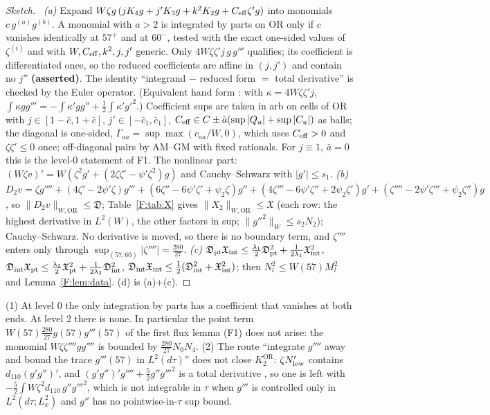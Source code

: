 \documentclass[11pt]{article}
\newcommand{\OR}{\mathrm{OR}}\newcommand{\eI}{\varepsilon_I}
\newcommand{\fD}{\mathfrak D}\newcommand{\fX}{\mathfrak X}\newcommand{\fa}{\mathfrak a}
\begin{document}
\begin{proof}[Sketch]\tH\
\emph{(a)} Expand $W\zeta g\,(jK_4g+j'K_3g+k^2K_2g+C_{\rm eff}\zeta'g)$ into monomials $c\,g^{(a)}g^{(b)}$. A monomial with $a>2$ is integrated by parts on $\OR$ only if $c$ vanishes identically at $57^+$ and at $60^-$, tested with the exact one-sided values of $\zeta^{(i)}$ and with $W,C_{\rm eff},k^2,j,j'$ generic. Only $4W\zeta\zeta'j\,g\,g'''$ qualifies; its coefficient is differentiated once, so the reduced coefficients are affine in $(j,j')$ and contain no $j''$ \textbf{(asserted)}. The identity ``integrand $-$ reduced form $=$ total derivative'' is checked by the Euler operator. (Equivalent hand form \tS: with $\kappa=4W\zeta\zeta'j$, $\int\kappa gg'''=-\int\kappa'gg''+\frac12\int\kappa'g'^2$.) Coefficient sups are taken in arb on cells of $\OR$ with $j\in[1-\bar c,1+\bar c]$, $j'\in[-\bar c_1,\bar c_1]$, $C_{\rm eff}\in C\pm\bar a(\sup|Q_u|+\sup|C_u|)$ as balls; the diagonal is one-sided, $\Gamma_{aa}=\sup\max(c_{aa}/W,0)$, which uses $C_{\rm eff}>0$ and $\zeta\zeta'\le0$ once; off-diagonal pairs by AM--GM with fixed rationals. For $j\equiv1$, $\bar a=0$ this is the level-0 statement of F1. The nonlinear part: $(W\zeta v)'=W(\zeta^2g'+(2\zeta\zeta'-\psi'\zeta^2)g)$ and Cauchy--Schwarz with $|g'|\le s_1$.
\emph{(b)} $D_2v=\zeta g''''+(4\zeta'-2\psi'\zeta)g'''+(6\zeta''-6\psi'\zeta'+\psi_2\zeta)g''+(4\zeta'''-6\psi'\zeta''+2\psi_2\zeta')g'+(\zeta''''-2\psi'\zeta'''+\psi_2\zeta'')g$ \tS, so $\|D_2v\|_{W,\OR}\le\fD$; Table~\ref{F:tab:X} gives $\|X_2\|_{W,\OR}\le\fX$ (each row: the highest derivative in $L^2(W)$, the other factors in sup; $\|g''^2\|_W\le s_2N_2$); Cauchy--Schwarz. No derivative is moved, so there is no boundary term, and $\zeta''''$ enters only through $\sup_{(57,60)}|\zeta''''|=\frac{280}{27}$.
\emph{(c)} $\fD_{\rm pt}\fX_{\rm int}\le\frac{\lambda_1}2\fD_{\rm pt}^2+\frac1{2\lambda_1}\fX_{\rm int}^2$, $\fD_{\rm int}\fX_{\rm pt}\le\frac{\lambda_2}2\fX_{\rm pt}^2+\frac1{2\lambda_2}\fD_{\rm int}^2$, $\fD_{\rm int}\fX_{\rm int}\le\frac12(\fD_{\rm int}^2+\fX_{\rm int}^2)$; then $N_l^2\le W(57)M_l^2$ and Lemma~\ref{F:lem:data}. (d) is (a)+(c).
\end{proof}

\begin{remark}\label{F:rem:trace}
(1) At level 0 the only integration by parts has a coefficient that vanishes at both ends. At level 2 there is none. In particular the point term $W(57)\frac{280}{27}g(57)g'''(57)$ of the first flux lemma (F1) does not arise: the monomial $W\zeta\zeta''''gg''''$ is bounded by $\frac{280}{27}N_0N_4$.
(2) The route ``integrate $g''''$ away and bound the trace $g'''(57)$ in $L^2(d\tau)$'' does not close $K_2^{\OR}$: $\zeta N_{\rm low}'$ contains $d_{110}(g'g'')'$, and $(g'g'')'g''''+\frac52g''g'''^2$ is a total derivative \tS, so one is left with $-\frac52\int W\zeta^2d_{110}\,g''g'''^2$, which is not integrable in $\tau$ when $g'''$ is controlled only in $L^2(d\tau;L^2_x)$ and $g''$ has no pointwise-in-$\tau$ sup bound.
\end{remark}
\end{document}
